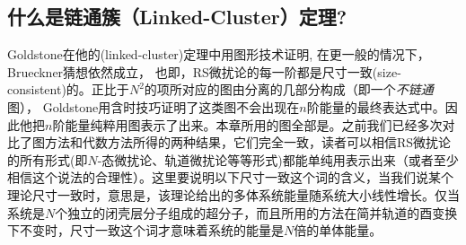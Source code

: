 \subsection{什么是链通簇（Linked-Cluster）定理?}
Goldstone在他的(linked-cluster)定理中用图形技术证明, 在更一般的情况下，Brueckner猜想依然成立， 也即，RS微扰论的每一阶都是尺寸一致(size-consistent)的。正比于$N^2$的项所对应的图由分离的几部分构成（即一个\emph{不链通}图）， Goldstone用含时技巧证明了这类图不会出现在$n$阶能量的最终表达式中。因此他把$n$阶能量纯粹用图表示了出来。本章所用的图全部是。之前我们已经多次对比了图方法和代数方法所得的两种结果，它们完全一致，读者可以相信RS微扰论的所有形式(即$N$-态微扰论、轨道微扰论等等形式)都能单纯用表示出来（或者至少相信这个说法的合理性）。这里要说明以下尺寸一致这个词的含义，当我们说某个理论尺寸一致时，意思是，该理论给出的多体系统能量随系统大小线性增长。仅当系统是$N$个独立的闭壳层分子组成的超分子，而且所用的方法在简并轨道的酉变换下不变时，尺寸一致这个词才意味着系统的能量是$N$倍的单体能量。
